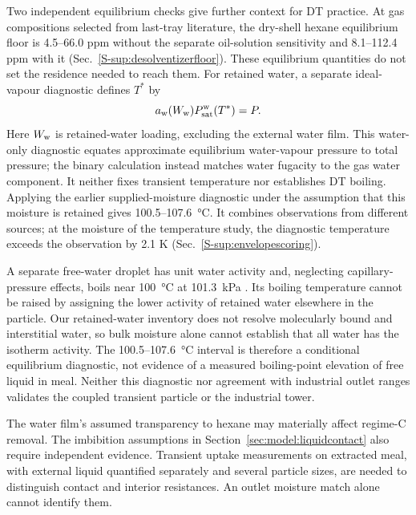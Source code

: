 Two independent equilibrium checks give further context for DT practice.
At gas compositions selected from last-tray literature, the dry-shell hexane equilibrium floor is
4.5--66.0 ppm without the separate oil-solution sensitivity and
8.1--112.4 ppm with it (Sec.~\ref*{S-sup:desolventizerfloor}). These
equilibrium quantities do not set the residence needed to reach them.
For retained water, a separate ideal-vapour diagnostic defines $T^*$ by
\begin{equation}
a_{\mathrm{w}}(W_{\mathrm w})P_{\mathrm{sat}}^{\mathrm w}(T^*)=P.
\label{eq:sorbedbp}
\end{equation}
Here $W_{\mathrm w}$ is retained-water loading, excluding the external
water film. This water-only diagnostic equates approximate equilibrium water-vapour
pressure to total pressure; the binary calculation instead matches water
fugacity to the gas water component. It neither fixes transient temperature
nor establishes DT boiling.
Applying the earlier supplied-moisture diagnostic under the assumption
that this moisture is retained gives 100.5--\SI{107.6}{\celsius}.
It combines observations from different sources; at the moisture of the
temperature study, the diagnostic temperature exceeds the observation
by 2.1 K (Sec.~\ref*{S-sup:envelopescoring}).

A separate free-water droplet has unit water activity and, neglecting
capillary-pressure effects, boils near \SI{100}{\celsius} at
\SI{101.3}{\kilo\pascal} \citep{wagner2002iapws,iapws2018r695}.
Its boiling temperature cannot be raised by assigning the lower activity
of retained water elsewhere in the particle. Our retained-water inventory
does not resolve molecularly bound and interstitial water, so bulk
moisture alone cannot establish that all water has the isotherm activity.
The 100.5--\SI{107.6}{\celsius} interval is therefore a conditional
equilibrium diagnostic, not evidence of a measured boiling-point elevation
of free liquid in meal. Neither this diagnostic nor agreement with
industrial outlet ranges validates the coupled transient particle or the
industrial tower.

The water film's assumed transparency to hexane may materially affect
regime-C removal. The imbibition assumptions in
Section~\ref{sec:model:liquidcontact} also require independent evidence. Transient uptake
measurements on extracted meal, with external liquid quantified separately
and several particle sizes, are needed to distinguish contact and interior
resistances. An outlet moisture match alone cannot identify them.

